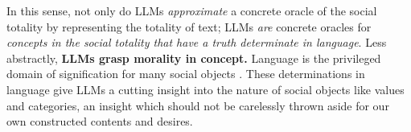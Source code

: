 In this sense, not only do LLMs \textit{approximate} a concrete oracle of the social totality by representing
the totality of text; LLMs \textit{are} concrete oracles for \textit{concepts in the social totality that have a truth determinate in language}. Less abstractly, \textbf{LLMs grasp morality in concept. }Language is the privileged domain of signification for many social objects \cite{harnad1990symbol}. These determinations in language give LLMs a cutting insight into the nature of social objects like values and categories, an insight which should not be carelessly thrown aside for our own constructed contents and desires.







    




